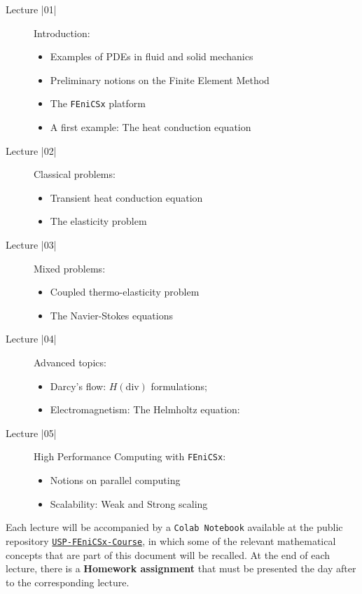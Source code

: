 \begin{description}
	\item[Lecture |01|] Introduction:
	\begin{itemize}
		\item Examples of PDEs in fluid and solid mechanics
		\item Preliminary notions on the Finite Element Method
		\item The \texttt{FEniCSx} platform
		\item A first example: The heat conduction equation
	\end{itemize}
	
	\item[Lecture |02|] Classical problems:
	\begin{itemize}
		\item Transient heat conduction equation
		\item The elasticity problem
	\end{itemize}
	
	\item[Lecture |03|] Mixed problems:
	\begin{itemize}
		\item Coupled thermo-elasticity problem
		\item The Navier-Stokes equations
	\end{itemize}
	
	\item[Lecture |04|] Advanced topics:	
	\begin{itemize}
		\item Darcy's flow: $H(\mbox{div})$ formulations;
		\item Electromagnetism: The Helmholtz equation: 
	\end{itemize}
	
	\item[Lecture |05|] High Performance Computing with \texttt{FEniCSx}:	
	\begin{itemize}
		\item Notions on parallel computing
		\item Scalability: Weak and Strong scaling
	\end{itemize}
	
\end{description}

Each lecture will be accompanied by a \texttt{Colab Notebook} 
available at the public repository 
\href{https://fenicsproject.org/}{\texttt{USP-FEniCSx-Course}},
in which some of the relevant mathematical concepts that are part of 
this document will be recalled. At the end of each lecture, there is a
\textbf{Homework assignment} that must be presented the day after
to the corresponding lecture. 

